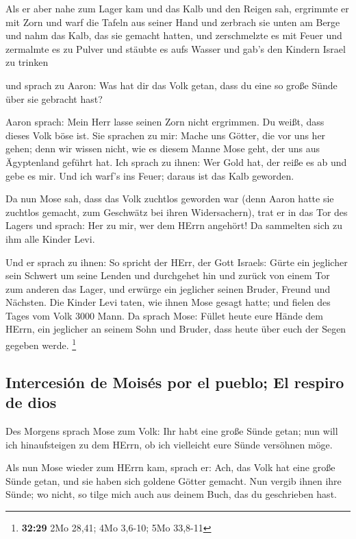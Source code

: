  Als er aber nahe zum Lager kam und das Kalb und den
Reigen sah, ergrimmte er mit Zorn und warf die Tafeln aus seiner Hand
und zerbrach sie unten am Berge  und nahm das Kalb, das
sie gemacht hatten, und zerschmelzte es mit Feuer und zermalmte es zu
Pulver und stäubte es aufs Wasser und gab's den Kindern Israel zu
trinken

 und sprach zu Aaron: Was hat dir das Volk getan, dass du
eine so große Sünde über sie gebracht hast?

 Aaron sprach: Mein Herr lasse seinen Zorn nicht
ergrimmen. Du weißt, dass dieses Volk böse ist.  Sie
sprachen zu mir: Mache uns Götter, die vor uns her gehen; denn wir
wissen nicht, wie es diesem Manne Mose geht, der uns aus Ägyptenland
geführt hat.  Ich sprach zu ihnen: Wer Gold hat, der
reiße es ab und gebe es mir. Und ich warf's ins Feuer; daraus ist das
Kalb geworden.

 Da nun Mose sah, dass das Volk zuchtlos geworden war
(denn Aaron hatte sie zuchtlos gemacht, zum Geschwätz bei ihren
Widersachern),  trat er in das Tor des Lagers und sprach:
Her zu mir, wer dem HErrn angehört! Da sammelten sich zu ihm alle Kinder
Levi.

 Und er sprach zu ihnen: So spricht der HErr, der Gott
Israels: Gürte ein jeglicher sein Schwert um seine Lenden und durchgehet
hin und zurück von einem Tor zum anderen das Lager, und erwürge ein
jeglicher seinen Bruder, Freund und Nächsten.  Die Kinder
Levi taten, wie ihnen Mose gesagt hatte; und fielen des Tages vom Volk
3000 Mann.  Da sprach Mose: Füllet heute eure Hände dem
HErrn, ein jeglicher an seinem Sohn und Bruder, dass heute über euch der
Segen gegeben werde. \footnote{\textbf{32:29} 2Mo 28,41; 4Mo 3,6-10; 5Mo
  33,8-11}

\hypertarget{intercesiuxf3n-de-moisuxe9s-por-el-pueblo-el-respiro-de-dios}{%
\subsection{Intercesión de Moisés por el pueblo; El respiro de
dios}\label{intercesiuxf3n-de-moisuxe9s-por-el-pueblo-el-respiro-de-dios}}

 Des Morgens sprach Mose zum Volk: Ihr habt eine große
Sünde getan; nun will ich hinaufsteigen zu dem HErrn, ob ich vielleicht
eure Sünde versöhnen möge.

 Als nun Mose wieder zum HErrn kam, sprach er: Ach, das
Volk hat eine große Sünde getan, und sie haben sich goldene Götter
gemacht.  Nun vergib ihnen ihre Sünde; wo nicht, so tilge
mich auch aus deinem Buch, das du geschrieben hast.

